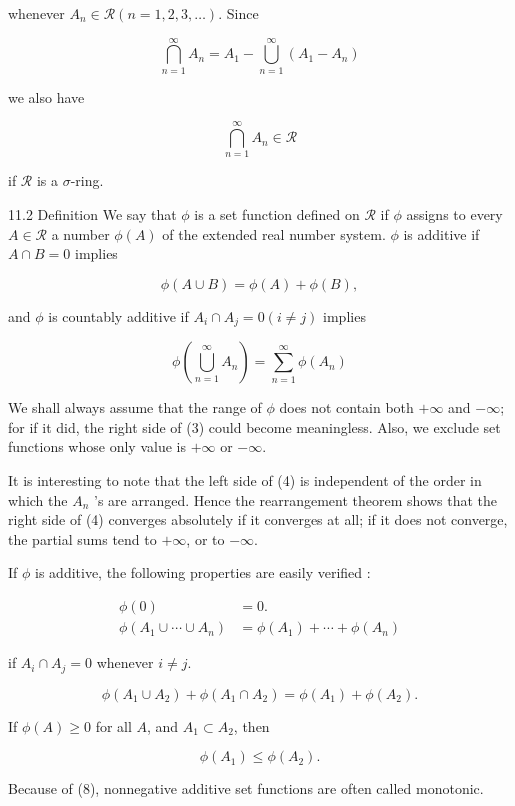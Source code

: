 \documentclass[10pt]{article}
\begin{document}
whenever $A_{n} \in \mathscr{R}(n=1,2,3, \ldots)$. Since

$$
\bigcap_{n=1}^{\infty} A_{n}=A_{1}-\bigcup_{n=1}^{\infty}\left(A_{1}-A_{n}\right)
$$

we also have

$$
\bigcap_{n=1}^{\infty} A_{n} \in \mathscr{R}
$$

if $\mathscr{R}$ is a $\sigma$-ring.

11.2 Definition We say that $\phi$ is a set function defined on $\mathscr{R}$ if $\phi$ assigns to every $A \in \mathscr{R}$ a number $\phi(A)$ of the extended real number system. $\phi$ is additive if $A \cap B=0$ implies

$$
\phi(A \cup B)=\phi(A)+\phi(B),
$$

and $\phi$ is countably additive if $A_{i} \cap A_{j}=0(i \neq j)$ implies

$$
\phi\left(\bigcup_{n=1}^{\infty} A_{n}\right)=\sum_{n=1}^{\infty} \phi\left(A_{n}\right)
$$

We shall always assume that the range of $\phi$ does not contain both $+\infty$ and $-\infty$; for if it did, the right side of (3) could become meaningless. Also, we exclude set functions whose only value is $+\infty$ or $-\infty$.

It is interesting to note that the left side of (4) is independent of the order in which the $A_{n}$ 's are arranged. Hence the rearrangement theorem shows that the right side of (4) converges absolutely if it converges at all; if it does not converge, the partial sums tend to $+\infty$, or to $-\infty$.

If $\phi$ is additive, the following properties are easily verified :

$$
\begin{aligned}
\phi(0) & =0 . \\
\phi\left(A_{1} \cup \cdots \cup A_{n}\right) & =\phi\left(A_{1}\right)+\cdots+\phi\left(A_{n}\right)
\end{aligned}
$$

if $A_{i} \cap A_{j}=0$ whenever $i \neq j$.

$$
\phi\left(A_{1} \cup A_{2}\right)+\phi\left(A_{1} \cap A_{2}\right)=\phi\left(A_{1}\right)+\phi\left(A_{2}\right) .
$$

If $\phi(A) \geq 0$ for all $A$, and $A_{1} \subset A_{2}$, then

$$
\phi\left(A_{1}\right) \leq \phi\left(A_{2}\right) .
$$

Because of (8), nonnegative additive set functions are often called monotonic.
\end{document}
